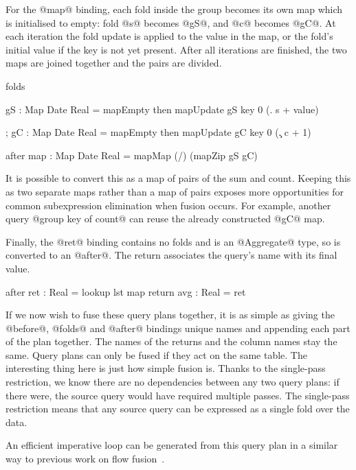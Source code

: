 For the @map@ binding, each fold inside the group becomes its own map which is initialised to empty: fold @s@ becomes @gS@, and @c@ becomes @gC@.
At each iteration the fold update is applied to the value in the map, or the fold's initial value if the key is not yet present.
After all iterations are finished, the two maps are joined together and the pairs are divided.
\begin{code}
  folds  { gS  : Map Date Real = mapEmpty
           then mapUpdate gS key 0 (\s. s + value)

         ; gC  : Map Date Real = mapEmpty
           then mapUpdate gC key 0 (\c. c + 1) }

  after  { map : Map Date Real
               = mapMap (/) (mapZip gS gC) }
\end{code}

It is possible to convert this as a map of pairs of the sum and count.
Keeping this as two separate maps rather than a map of pairs exposes more opportunities for common subexpression elimination when fusion occurs.
For example, another query @group key of count@ can reuse the already constructed @gC@ map.

Finally, the @ret@ binding contains no folds and is an @Aggregate@ type, so is converted to an @after@.
The return associates the query's name with its final value.
\begin{code}
  after  { ret : Real = lookup lst map }
  return { avg : Real = ret }
\end{code}


If we now wish to fuse these query plans together, it is as simple as giving the @before@, @folds@ and @after@ bindings unique names and appending each part of the plan together.
The names of the returns and the column names stay the same.
Query plans can only be fused if they act on the same table.
The interesting thing here is just how simple fusion is.
Thanks to the single-pass restriction, we know there are no dependencies between any two query plans: if there were, the source query would have required multiple passes.
The single-pass restriction means that any source query can be expressed as a single fold over the data.

An efficient imperative loop can be generated from this query plan in a similar way to previous work on flow fusion~\cite{lippmeier2013data}.

